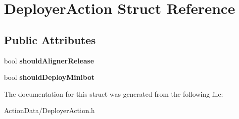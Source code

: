 \hypertarget{struct_deployer_action}{
\section{\-Deployer\-Action \-Struct \-Reference}
\label{struct_deployer_action}
}
\subsection*{\-Public \-Attributes}
\begin{DoxyCompactItemize}
\item 
\hypertarget{struct_deployer_action_aa5d1c4f32c2db658dd39d0befe29dd1d}{
bool {\bfseries should\-Aligner\-Release}}
\label{struct_deployer_action_aa5d1c4f32c2db658dd39d0befe29dd1d}

\item 
\hypertarget{struct_deployer_action_a6a9e5dc1de5f489da4ae6b7b6f460531}{
bool {\bfseries should\-Deploy\-Minibot}}
\label{struct_deployer_action_a6a9e5dc1de5f489da4ae6b7b6f460531}

\end{DoxyCompactItemize}


\-The documentation for this struct was generated from the following file\-:\begin{DoxyCompactItemize}
\item 
\-Action\-Data/\-Deployer\-Action.\-h\end{DoxyCompactItemize}
